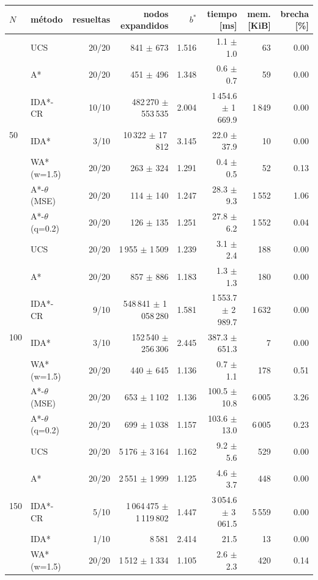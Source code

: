 \begin{tabular}{llrrrrrr}
\toprule
$N$ & método & resueltas & nodos expandidos & $b^*$ & tiempo [ms] & mem. [KiB] & brecha [\%] \\
\midrule
\multirow{7}{*}{50} & UCS & 20/20 & 841 $\pm$ 673 & 1.516 & 1.1 $\pm$ 1.0 & 63 & 0.00 \\
 & A* & 20/20 & 451 $\pm$ 496 & 1.348 & 0.6 $\pm$ 0.7 & 59 & 0.00 \\
 & IDA*-CR & 10/10 & 482\,270 $\pm$ 553\,535 & 2.004 & 1\,454.6 $\pm$ 1\,669.9 & 1\,849 & 0.00 \\
 & IDA* & 3/10 & 10\,322 $\pm$ 17\,812 & 3.145 & 22.0 $\pm$ 37.9 & 10 & 0.00 \\
 & WA* (w=1.5) & 20/20 & 263 $\pm$ 324 & 1.291 & 0.4 $\pm$ 0.5 & 52 & 0.13 \\
 & A*-$\theta$ (MSE) & 20/20 & 114 $\pm$ 140 & 1.247 & 28.3 $\pm$ 9.3 & 1\,552 & 1.06 \\
 & A*-$\theta$ (q=0.2) & 20/20 & 126 $\pm$ 135 & 1.251 & 27.8 $\pm$ 6.2 & 1\,552 & 0.04 \\
\midrule
\multirow{7}{*}{100} & UCS & 20/20 & 1\,955 $\pm$ 1\,509 & 1.239 & 3.1 $\pm$ 2.4 & 188 & 0.00 \\
 & A* & 20/20 & 857 $\pm$ 886 & 1.183 & 1.3 $\pm$ 1.3 & 180 & 0.00 \\
 & IDA*-CR & 9/10 & 548\,841 $\pm$ 1\,058\,280 & 1.581 & 1\,553.7 $\pm$ 2\,989.7 & 1\,632 & 0.00 \\
 & IDA* & 3/10 & 152\,540 $\pm$ 256\,306 & 2.445 & 387.3 $\pm$ 651.3 & 7 & 0.00 \\
 & WA* (w=1.5) & 20/20 & 440 $\pm$ 645 & 1.136 & 0.7 $\pm$ 1.1 & 178 & 0.51 \\
 & A*-$\theta$ (MSE) & 20/20 & 653 $\pm$ 1\,102 & 1.136 & 100.5 $\pm$ 10.8 & 6\,005 & 3.26 \\
 & A*-$\theta$ (q=0.2) & 20/20 & 699 $\pm$ 1\,038 & 1.157 & 103.6 $\pm$ 13.0 & 6\,005 & 0.23 \\
\midrule
\multirow{7}{*}{150} & UCS & 20/20 & 5\,176 $\pm$ 3\,164 & 1.162 & 9.2 $\pm$ 5.6 & 529 & 0.00 \\
 & A* & 20/20 & 2\,551 $\pm$ 1\,999 & 1.125 & 4.6 $\pm$ 3.7 & 448 & 0.00 \\
 & IDA*-CR & 5/10 & 1\,064\,475 $\pm$ 1\,119\,802 & 1.447 & 3\,054.6 $\pm$ 3\,061.5 & 5\,559 & 0.00 \\
 & IDA* & 1/10 & 8\,581 & 2.414 & 21.5 & 13 & 0.00 \\
 & WA* (w=1.5) & 20/20 & 1\,512 $\pm$ 1\,334 & 1.105 & 2.6 $\pm$ 2.3 & 420 & 0.14 \\

\end{tabular}
